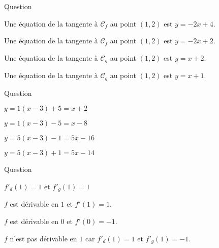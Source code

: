 

\begin{multi}[multiple,feedback=
{Une équation de la tangente à \(\mathcal{C}_f\) au point \((a,f(a))\) est : 
\[y=f'(a)(x-a)+f(a).\]
Ici, \(\displaystyle f'(x)=-\frac{2}{x^2}\) et \(\displaystyle g'(x)=\frac{1}{\sqrt{x}}\).
}]{Question}
    \item* Une équation de la tangente à \(\mathcal{C}_f\) au point \((1,2)\) est \(y=-2x+4\).
    \item Une équation de la tangente à \(\mathcal{C}_f\) au point \((1,2)\) est \(y=-2x+2\).
    \item Une équation de la tangente à \(\mathcal{C}_g\) au point \((1,2)\) est \(y=x+2\).
    \item* Une équation de la tangente à \(\mathcal{C}_g\) au point \((1,2)\) est \(y=x+1\).
\end{multi}


\begin{multi}[multiple,feedback=
{On applique la formule du cours \(\displaystyle y=f'(3)(x-3)+f(3)=5(x-3)+1\).
}]{Question}
    \item \(y=1(x-3)+5=x+2\)
    \item \(y=1(x-3)-5=x-8\)
    \item \(y=5(x-3)-1=5x-16\)
    \item* \(y=5(x-3)+1=5x-14\)
\end{multi}


\begin{multi}[multiple,feedback=
{Par définition, on a :
\[f(x)=\left\{ \begin{array}{ll}x-1&\mbox{si }x\geq 1\\ 1-x&\mbox{si }x\leq 1.
\end{array}\right.\]
Donc, \(f\) est dérivable sur \(\Rr\setminus\{1\}\), et
\[f'(x)=\left\{ \begin{array}{ll}1&\mbox{si }x> 1\\ -1&\mbox{si }x< 1.
\end{array}\right.\]
En particulier, \(f'(0)=-1\). Par contre \(f\) n'est pas dérivable en \(1\) car
\[\lim _{x\to 1^+}\frac{f(x)-f(1)}{x-1}=1 \mbox{ et }\lim _{x\to 1^-}\frac{f(x)-f(1)}{x-1}=-1.\]
}]{Question}
    \item \(f'_d(1)=1\) et \(f'_g(1)=1\)
    \item \(f\) est dérivable en \(1\) et \(f'(1)=1\).
    \item* \(f\) est dérivable en \(0\) et \(f'(0)=-1\).
    \item* \(f\) n'est pas dérivable en \(1\) car \(f'_d(1)=1\) et \(f'_g(1)=-1\).
\end{multi}


